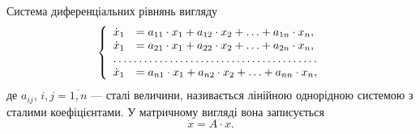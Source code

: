 Система диференціальних рівнянь вигляду
\begin{equation*}
	\left\{
		\begin{array}{rl}
			\dot x_1 &= a_{11} \cdot x_1 + a_{12} \cdot x_2 + \ldots + a_{1n} \cdot x_n, \\
			\dot x_1 &= a_{21} \cdot x_1 + a_{22} \cdot x_2 + \ldots + a_{2n} \cdot x_n, \\
			\hdotsfor{2} \\
			\dot x_1 &= a_{n1} \cdot x_1 + a_{n2} \cdot x_2 + \ldots + a_{nn} \cdot x_n,
		\end{array}
	\right.
\end{equation*}
де $a_{ij}$, $i,j = \overline{1, n}$ --- сталі величини, називається лінійною однорідною системою з сталими коефіцієнтами. У матричному вигляді вона записується
\begin{equation*}
	\dot x = A \cdot x.
\end{equation*}
